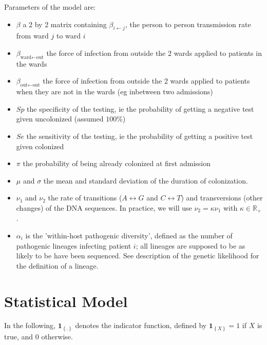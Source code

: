 \documentclass[10pt]{article}
\begin{document}
Parameters of the model are: 
\begin{itemize}
	\item $\beta$ a 2 by 2 matrix containing $\beta_{i \leftarrow j}$, the person to person transmission rate from ward $j$ to ward $i$
	\item $\beta_{\text{ward} \leftarrow \text{out}}$ the force of infection from outside the 2 wards applied to patients in the wards
	\item $\beta_{\text{out} \leftarrow \text{out}}$ the force of infection from outside the 2 wards applied to patients when they are not in the wards (eg inbetween two admissions)
	\item $Sp$ the specificity of the testing, ie the probability of getting a negative test given uncolonized (assumed $100\%$)
	\item $Se$ the sensitivity of the testing, ie the probability of getting a positive test given colonized
	\item $\pi$ the probability of being already colonized at first admission
	\item $\mu$ and $\sigma$ the mean and standard deviation of the duration of colonization.
	\item $\nu_1$ and $\nu_2$ the rate of transitions ($A \leftrightarrow G$ and $C \leftrightarrow T$) and transversions (other changes) of the DNA sequences. In practice, we will use $\nu_2=\kappa\nu_1$ with $\kappa \in \mathbb{R}_+$.
	\item $\alpha_i$ is the 'within-host pathogenic diversity', defined as the number of pathogenic lineages infecting patient $i$; all lineages are supposed to be as likely to be have been sequenced. See description of the genetic likelihood for the definition of a lineage.
\end{itemize}

\section*{Statistical Model}

In the following, $\mathbf{1}_{\left\lbrace.\right\rbrace}$ denotes the indicator function, defined by $\mathbf{1}_{\left\lbrace X \right\rbrace}=1$ if $X$ is true, and $0$ otherwise.
\end{document}
